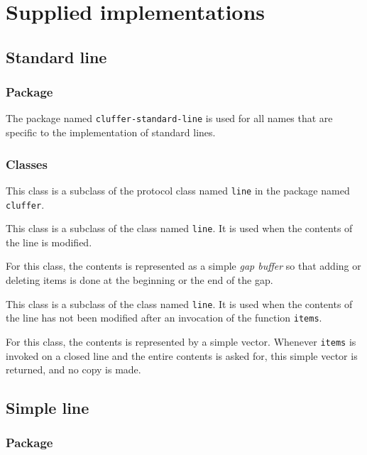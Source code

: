 \chapter{Supplied implementations}
\label{chap-supplied-implementations}

\section{Standard line}
\label{sec-standard-line}

\subsection{Package}

The package named \texttt{cluffer-standard-line} is used for all names
that are specific to the implementation of standard lines.

\subsection{Classes}


This class is a subclass of the protocol class named \texttt{line} in
the package named \texttt{cluffer}.


This class is a subclass of the class named \texttt{line}.  It is used
when the contents of the line is modified.

For this class, the contents is represented as a simple \emph{gap
  buffer} so that adding or deleting items is done at the beginning or
the end of the gap.


This class is a subclass of the class named \texttt{line}.  It is used
when the contents of the line has not been modified after an
invocation of the function \texttt{items}.

For this class, the contents is represented by a simple \commonlisp{}
vector.  Whenever \texttt{items} is invoked on a closed line and the
entire contents is asked for, this simple vector is returned, and no
copy is made.

\section{Simple line}

\subsection{Package}

